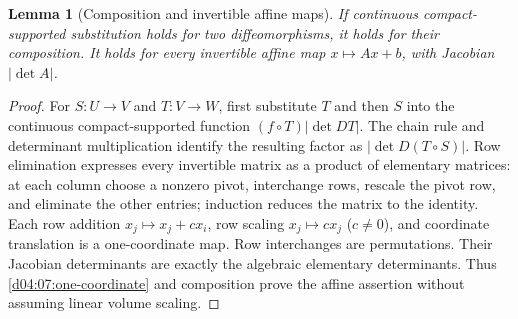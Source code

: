 \documentclass[11pt,oneside,openany]{book}
\newtheorem{lemma}[theorem]{Lemma}
\theoremstyle{definition}
\theoremstyle{remark}
\begin{document}
\begin{lemma}[Composition and invertible affine maps]\label{d04:07:affine}
If continuous compact-supported substitution holds for two diffeomorphisms, it holds for their composition. It holds for every invertible affine map $x\mapsto Ax+b$, with Jacobian $|\det A|$.
\end{lemma}
\begin{proof}
For $S:U\to V$ and $T:V\to W$, first substitute $T$ and then $S$ into the continuous compact-supported function $(f\circ T)|\det DT|$. The chain rule and determinant multiplication identify the resulting factor as $|\det D(T\circ S)|$. Row elimination expresses every invertible matrix as a product of elementary matrices: at each column choose a nonzero pivot, interchange rows, rescale the pivot row, and eliminate the other entries; induction reduces the matrix to the identity. Each row addition $x_j\mapsto x_j+cx_i$, row scaling $x_j\mapsto cx_j$ ($c\ne0$), and coordinate translation is a one-coordinate map. Row interchanges are permutations. Their Jacobian determinants are exactly the algebraic elementary determinants. Thus \cref{d04:07:one-coordinate} and composition prove the affine assertion without assuming linear volume scaling.
\end{proof}
\end{document}
